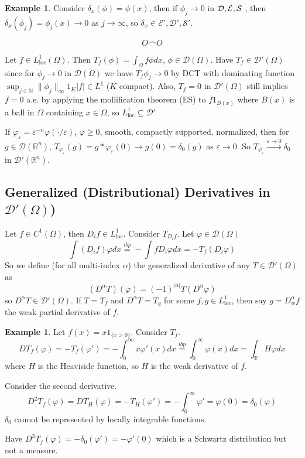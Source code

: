 \documentclass{article}
\newcommand{\e}{\varepsilon}
\theoremstyle{definition}
\newtheorem{example}[defn]{Example}
\theoremstyle{remark}
\theoremstyle{plain}
\newcommand{\NN}{\mathbb{N}}
\newcommand{\RR}{\mathbb{R}}
\newcommand{\calD}{\mathcal{D}}
\begin{document}
\begin{example}
    Consider $\delta_x(\phi)=\phi(x)$, then if $\phi_j\to0$ in $\cal D,\mathcal E,\mathcal S$ , then $\delta_x(\phi_j)=\phi_j(x)\to 0$ as $j\to\infty$, so $\delta_x\in\mathcal E',\mathcal D',\mathcal S'$.
\end{example}
\[O\frown O\tag{Owen's Signature}\]

Let $f\in L^1_{\text{loc}}(\Omega)$. Then $T_f(\phi)=\int_\Omega f\phi dx$, $\phi\in\calD(\Omega)$. Have $T_f\in\calD'(\Omega)$ since for $\phi_j\to 0$ in $\calD(\Omega)$ we have $T_f\phi_j\to0$ by DCT with dominating function $\sup_{j\in\NN}\|\phi_j\|_\infty1_K|f|\in L^1$ ($K$ compact). Also, $T_f=0$ in $\calD'(\Omega)$ still implies $f=0$ a.e. by applying the mollification theorem (ES) to $f1_{B(x)}$ where $B(x)$ is a ball in $\Omega$ containing $x\in\Omega$, so $L^1_{\text{loc}}\subseteq\calD'$

If $\varphi_\e=\e^{-n}\varphi(\cdot/\e)$, $\varphi\ge 0$, smooth, compactly supported, normalized, then for $g\in\calD(\RR^n)$, $T_{\varphi_\e}(g)=g\ast\varphi_\e(0)\to g(0)=\delta_0(g)$ as $\e\to0$. So $T_{\varphi_\e}\overset{\e\to0}{\to}\delta_0$ in $\calD'(\RR^n)$.
\subsection{Generalized (Distributional) Derivatives in $\calD'(\Omega)$)}
Let $f\in C^1(\Omega)$, then $D_if\in L^1_{\text{loc}}$. Consider $T_{D_if}$. Let $\varphi\in\calD(\Omega)$
\[\int (D_if)\varphi dx\overset{ibp}{=}-\int fD_i\varphi dx=-T_f(D_i\varphi)\]
So we define (for all multi-index $\alpha$) the generalized derivative of any $T\in\calD'(\Omega)$ as
\[(D^\alpha T)(\varphi)=(-1)^{|\alpha|}T(D^\alpha\varphi)\]
so $D^\alpha T\in\calD'(\Omega)$. If $T=T_f$ and $D^\alpha T=T_g$ for some $f,g\in L^1_{\text{loc}}$, then say $g=D^\alpha_wf$ the weak partial derivative of $f$.

\begin{example}
    Let $f(x)=x1_{\{x>0\}}$. Consider $T_f$.
    \[DT_f(\varphi)=-T_f(\varphi')=-\int_0^\infty x\varphi'(x)dx\overset{ibp}{=}\int_0^\infty\varphi(x)dx=\int_\RR H\varphi dx\]
    where $H$ is the Heaviside function, so $H$ is the weak derivative of $f$.

    Consider the second derivative.
    \[D^2T_f(\varphi)=DT_H(\varphi)=-T_H(\varphi')=-\int_0^\infty\varphi'=\varphi(0)=\delta_0(\varphi)\]
    $\delta_0$ cannot be represented by locally integrable functions.

    Have $D^3T_f(\varphi)=-\delta_0(\varphi')=-\varphi'(0)$ which is a Schwartz distribution but not a measure.
\end{example}
\end{document}
